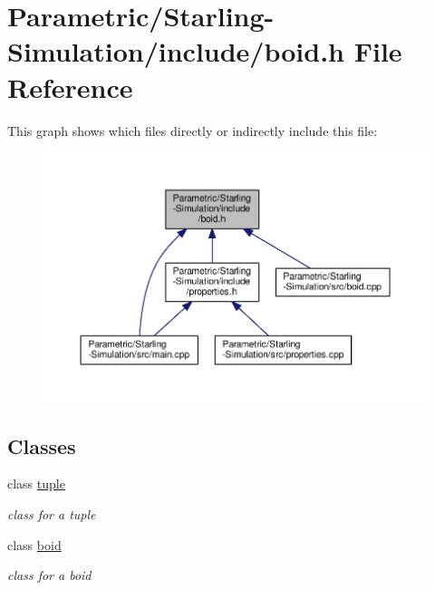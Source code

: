 \hypertarget{_parametric_2_starling-_simulation_2include_2boid_8h}{}\section{Parametric/\+Starling-\/\+Simulation/include/boid.h File Reference}
\label{_parametric_2_starling-_simulation_2include_2boid_8h}
This graph shows which files directly or indirectly include this file\+:
\nopagebreak
\begin{figure}[H]
\begin{center}
\leavevmode
\includegraphics[width=350pt]{_parametric_2_starling-_simulation_2include_2boid_8h__dep__incl}
\end{center}
\end{figure}
\subsection*{Classes}
\begin{DoxyCompactItemize}
\item 
class \hyperlink{classtuple}{tuple}
\begin{DoxyCompactList}\small\item\em class for a tuple \end{DoxyCompactList}\item 
class \hyperlink{classboid}{boid}
\begin{DoxyCompactList}\small\item\em class for a boid \end{DoxyCompactList}\end{DoxyCompactItemize}
